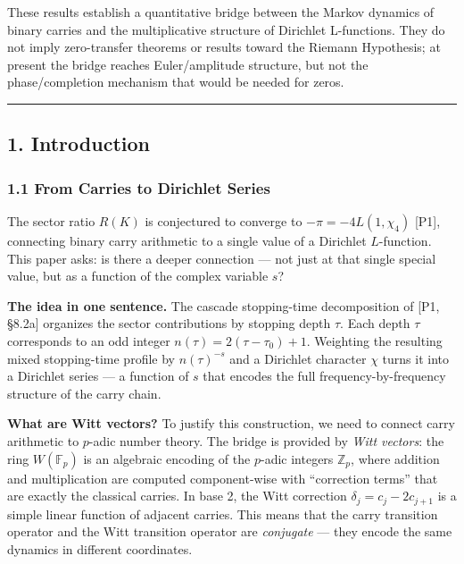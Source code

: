 \documentclass[
  11pt,
]{article}
\begin{document}
These results establish a quantitative bridge between the Markov dynamics of
binary carries and the multiplicative structure of Dirichlet L-functions. They
do not imply zero-transfer theorems or results toward the Riemann Hypothesis; at
present the bridge reaches Euler/amplitude structure, but not the
phase/completion mechanism that would be needed for zeros.

\begin{center}\rule{0.5\linewidth}{0.5pt}\end{center}

\newpage

\subsection{1. Introduction}\label{introduction}

\subsubsection{1.1 From Carries to Dirichlet
Series}\label{from-carries-to-dirichlet-series}

The sector ratio \(R(K)\) is conjectured to converge to
\(-\pi = -4L(1, \chi_4)\) {[}P1{]}, connecting binary carry arithmetic to a
single value of a Dirichlet \(L\)-function. This paper asks: is there a deeper
connection --- not just at that single special value, but as a function of the
complex variable \(s\)?

\textbf{The idea in one sentence.} The cascade stopping-time decomposition of
{[}P1, §8.2a{]} organizes the sector contributions by stopping depth \(\tau\).
Each depth \(\tau\) corresponds to an odd integer
\(n(\tau) = 2(\tau - \tau_0) + 1\). Weighting the resulting mixed stopping-time
profile by \(n(\tau)^{-s}\) and a Dirichlet character \(\chi\) turns it into a
Dirichlet series --- a function of \(s\) that encodes the full
frequency-by-frequency structure of the carry chain.

\textbf{What are Witt vectors?} To justify this construction, we need to connect
carry arithmetic to \(p\)-adic number theory. The bridge is provided by
\emph{Witt vectors}: the ring \(W(\mathbb{F}_p)\) is an algebraic encoding of
the \(p\)-adic integers \(\mathbb{Z}_p\), where addition and multiplication are
computed component-wise with ``correction terms'' that are exactly the classical
carries. In base 2, the Witt correction \(\delta_j = c_j - 2c_{j+1}\) is a
simple linear function of adjacent carries. This means that the carry transition
operator and the Witt transition operator are \emph{conjugate} --- they encode
the same dynamics in different coordinates.
\end{document}

